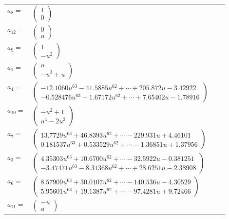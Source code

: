 \documentclass[1p]{elsarticle_modified}
\theoremstyle{definition}
\begin{document}
\begin{tabular}{m{7pt} m{180pt} m{7pt} m{180pt} }
\flushright $a_{8}=$&$\begin{pmatrix}1\\0\end{pmatrix}$ \\
\flushright $a_{12}=$&$\begin{pmatrix}0\\u\end{pmatrix}$ \\
\flushright $a_{9}=$&$\begin{pmatrix}1\\- u^2\end{pmatrix}$ \\
\flushright $a_{1}=$&$\begin{pmatrix}u\\- u^3+u\end{pmatrix}$ \\
\flushright $a_{4}=$&$\begin{pmatrix}-12.1060 u^{63}-41.5885 u^{62}+\cdots+205.872 u-3.42922\\-0.528476 u^{63}-1.67172 u^{62}+\cdots+7.65402 u-1.78916\end{pmatrix}$ \\
\flushright $a_{10}=$&$\begin{pmatrix}- u^2+1\\u^4-2 u^2\end{pmatrix}$ \\
\flushright $a_{7}=$&$\begin{pmatrix}13.7729 u^{63}+46.8393 u^{62}+\cdots-229.931 u+4.46101\\0.181537 u^{63}+0.533529 u^{62}+\cdots-1.36851 u+1.37956\end{pmatrix}$ \\
\flushright $a_{3}=$&$\begin{pmatrix}4.35303 u^{63}+10.6700 u^{62}+\cdots-32.5922 u-0.381251\\-3.47471 u^{63}-8.31368 u^{62}+\cdots+28.6251 u-2.38908\end{pmatrix}$ \\
\flushright $a_{6}=$&$\begin{pmatrix}8.57909 u^{63}+30.0107 u^{62}+\cdots-140.536 u-4.30529\\5.95601 u^{63}+19.1387 u^{62}+\cdots-97.4281 u+9.72466\end{pmatrix}$ \\
\flushright $a_{11}=$&$\begin{pmatrix}- u\\u\end{pmatrix}$ \\

\end{tabular}
\end{document}
